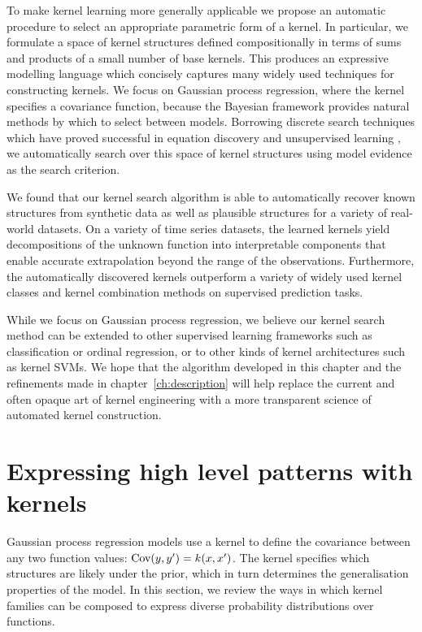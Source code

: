 To make kernel learning more generally applicable we propose an automatic procedure to select an appropriate parametric form of a kernel.
In particular, we formulate a space of kernel structures defined compositionally in terms of sums and products of a small number of base kernels.
This produces an expressive modelling language which concisely captures many widely used techniques for constructing kernels.
We focus on Gaussian process regression, where the kernel specifies a covariance function, because the Bayesian framework provides natural methods by which to select between models.
Borrowing discrete search techniques which have proved successful in equation discovery \citep{Todorovski1997-st} and unsupervised learning \citep{Grosse2012-zi}, we automatically search over this space of kernel structures using model evidence as the search criterion.

We found that our kernel search algorithm is able to automatically recover known structures from synthetic data as well as plausible structures for a variety of real-world datasets. 
On a variety of time series datasets, the learned kernels yield decompositions of the unknown function into interpretable components that enable accurate extrapolation beyond the range of the observations.
Furthermore, the automatically discovered kernels outperform a variety of widely used kernel classes and kernel combination methods on supervised prediction tasks.

While we focus on Gaussian process regression, we believe our kernel search method can be extended to other supervised learning frameworks such as classification or ordinal regression, or to other kinds of kernel architectures such as kernel SVMs.
We hope that the algorithm developed in this chapter and the refinements made in chapter~\ref{ch:description} will help replace the current and often opaque art of kernel engineering with a more transparent science of automated kernel construction.

\section{Expressing high level patterns with kernels} 
\label{sec:construction:structure}

Gaussian process regression models use a kernel to define the covariance between any two function values: ${\textrm{Cov}(y, y') = k(x,x')}$.
The kernel specifies which structures are likely under the \gp{} prior, which in turn determines the generalisation properties of the model.
In this section, we review the ways in which kernel families\footnotemark{} can be composed to express diverse probability distributions over functions. 

